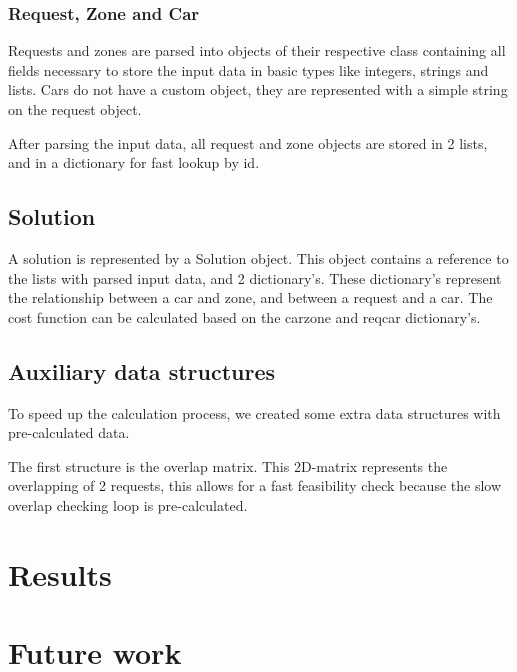 \documentclass[11pt]{article}
\begin{document}
        \subsubsection{Request, Zone and Car}
            Requests and zones are parsed into objects of their respective class containing all fields necessary to store the input data in basic types like integers, strings and lists.
            Cars do not have a custom object, they are represented with a simple string on the request object.

            After parsing the input data, all request and zone objects are stored in 2 lists, and in a dictionary for fast lookup by id. 
        
        \subsection{Solution}
            A solution is represented by a Solution object. This object contains a reference to the lists with parsed input data, and 2 dictionary's.
            These dictionary's represent the relationship between a car and zone, and between a request and a car.
            The cost function can be calculated based on the car\textunderscore zone and req\textunderscore car dictionary's.

        \subsection{Auxiliary data structures}
            To speed up the calculation process, we created some extra data structures with pre-calculated data.

            The first structure is the overlap matrix. This 2D-matrix represents the overlapping of 2 requests, this allows for a fast feasibility check because
            the slow overlap checking loop is pre-calculated.

            

\section{Results}

\section{Future work}
\end{document}
